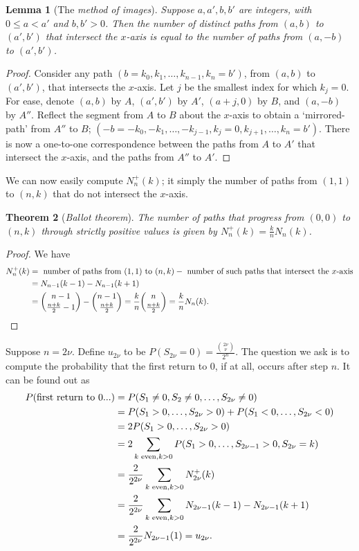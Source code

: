 \documentclass[15pt,a4paper]{book}
\newtheorem{theorem}{Theorem}[chapter]
\newtheorem{lemma}[theorem]{Lemma}
\theoremstyle{definition}
\newcommand{\eax}[1]{\emph{#1}\index{#1}} %
\begin{document}
\begin{lemma}[The \eax{method of images}]
    Suppose $a,a',b,b'$ are integers, with $0 \leq a < a'$ and $b,b'>0$. Then the number of distinct paths from $(a,b)$ to $(a',b')$ that intersect the $x$-axis is equal to the number of paths from $(a,-b)$ to $(a',b')$.
\end{lemma}
\begin{proof}
    Consider any path $(b=k_{0},k_{1},\ldots,k_{n-1},k_{n}=b')$, from $(a,b)$ to $(a',b')$, that intersects the $x$-axis. Let $j$ be the smallest index for which $k_{j}=0$. For ease, denote $(a,b)$ by $A$, $(a',b')$ by $A'$, $(a+j,0)$ by $B$, and $(a,-b)$ by $A''$. Reflect the segment from $A$ to $B$ about the $x$-axis to obtain a `mirrored-path' from $A''$ to $B$; $(-b=-k_{0},-k_{1},\ldots,-k_{j-1},k_{j}=0,k_{j+1},\ldots,k_{n}=b')$. There is now a one-to-one correspondence between the paths from $A$ to $A'$ that intersect the $x$-axis, and the paths from $A''$ to $A'$.
\end{proof}
We can now easily compute $N_{n}^{+}(k)$; it simply the number of paths from $(1,1)$ to $(n,k)$ that do not intersect the $x$-axis.
\begin{theorem}[\eax{Ballot theorem}]
    The number of paths that progress from $(0,0)$ to $(n,k)$ through strictly positive values is given by $N_{n}^{+}(k) = \frac{k}{n}N_{n}(k)$.
\end{theorem}
\begin{proof}
    We have
    \begin{align}
        N_{n}^{+}(k) &= \text{ number of paths from $(1,1)$ to $(n,k)$} - \text{ number of such paths that intersect the $x$-axis} \notag \\
        &= N_{n-1}(k-1) - N_{n-1}(k+1) \notag \\
        &= \binom{n-1}{\frac{n+k}{2}-1} - \binom{n-1}{\frac{n+k}{2}} = \frac{k}{n}\binom{n}{\frac{n+k}{2}} = \frac{k}{n}N_{n}(k).
    \end{align}
\end{proof}
Suppose $n = 2\nu$. Define $u_{2\nu}$ to be $P(S_{2\nu}=0) = \frac{\binom{2\nu}{\nu}}{2^{n}}$. The question we ask is to compute the probability that the first return to 0, if at all, occurs after step $n$. It can be found out as
\begin{align}
    P(\text{first return to $0$...}) &= P(S_{1}\neq 0, S_{2} \neq 0, \ldots, S_{2\nu} \neq 0) \\
    &= P(S_{1}>0,\ldots,S_{2\nu}>0) + P(S_{1}<0,\ldots,S_{2\nu}<0) \notag \\
    &= 2P(S_{1}>0,\ldots,S_{2\nu}>0) \notag \\
    &= 2 \sum_{k \text{ even}, k>0} P(S_{1}>0,\ldots,S_{2\nu-1}>0,S_{2\nu}=k) \notag \\
    &= \frac{2}{2^{2\nu}} \sum_{k \text{ even}, k>0} N_{2\nu}^{+}(k) \notag \\
    &= \frac{2}{2^{2\nu}} \sum_{k \text{ even}, k>0} N_{2\nu-1}(k-1)-N_{2\nu-1}(k+1) \notag \\
    &= \frac{2}{2^{2\nu}} N_{2\nu-1}(1) = u_{2\nu}.
\end{align}
\end{document}
